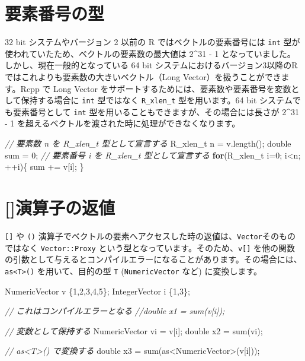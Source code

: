 \documentclass[]{book}
\newenvironment{Shaded}{\begin{snugshade}}{\end{snugshade}}
\newcommand{\CommentTok}[1]{\textcolor[rgb]{0.56,0.35,0.01}{\textit{#1}}}
\newcommand{\ControlFlowTok}[1]{\textcolor[rgb]{0.13,0.29,0.53}{\textbf{#1}}}
\newcommand{\DataTypeTok}[1]{\textcolor[rgb]{0.13,0.29,0.53}{#1}}
\newcommand{\DecValTok}[1]{\textcolor[rgb]{0.00,0.00,0.81}{#1}}
\newcommand{\NormalTok}[1]{#1}
\begin{document}
\section{要素番号の型}

32 bit システムやバージョン 2 以前の R ではベクトルの要素番号には \texttt{int} 型が使われていたため、ベクトルの要素数の最大値は 2\^{}31 - 1 となっていました。しかし、現在一般的となっている 64 bit システムにおけるバージョン3以降のRではこれよりも要素数の大きいベクトル（Long Vector）を扱うことができます。Rcpp で Long Vector をサポートするためには、要素数や要素番号を変数として保持する場合に \texttt{int} 型ではなく \texttt{R\_xlen\_t} 型を用います。64 bit システムでも要素番号として \texttt{int} 型を用いることもできますが、その場合には長さが 2\^{}31 - 1 を超えるベクトルを渡された時に処理ができなくなります。

\begin{Shaded}
\begin{Highlighting}[]
\CommentTok{// 要素数 n を R_xlen_t 型として宣言する}
\DataTypeTok{R_xlen_t}\NormalTok{ n = v.length();}
\DataTypeTok{double}\NormalTok{ sum = }\DecValTok{0}\NormalTok{;}
\CommentTok{// 要素番号 i を R_xlen_t 型として宣言する}
\ControlFlowTok{for}\NormalTok{(}\DataTypeTok{R_xlen_t}\NormalTok{ i=}\DecValTok{0}\NormalTok{; i<n; ++i)\{}
\NormalTok{  sum += v[i];}
\NormalTok{\}}
\end{Highlighting}
\end{Shaded}

\section{{[}{]}演算子の返値}

\texttt{{[}{]}} や \texttt{()} 演算子でベクトルの要素へアクセスした時の返値は、\texttt{Vector}そのものではなく \texttt{Vector::Proxy} という型となっています。そのため、\texttt{v{[}{]}} を他の関数の引数として与えるとコンパイルエラーになることがあります。その場合には、\texttt{as\textless{}T\textgreater{}()} を用いて、目的の型 \texttt{T} (\texttt{NumericVector} など) に変換します。

\begin{Shaded}
\begin{Highlighting}[]
\NormalTok{NumericVector v \{}\DecValTok{1}\NormalTok{,}\DecValTok{2}\NormalTok{,}\DecValTok{3}\NormalTok{,}\DecValTok{4}\NormalTok{,}\DecValTok{5}\NormalTok{\};}
\NormalTok{IntegerVector i \{}\DecValTok{1}\NormalTok{,}\DecValTok{3}\NormalTok{\};}

\CommentTok{// これはコンパイルエラーとなる}
\CommentTok{//double x1 = sum(v[i]);}

\CommentTok{// 変数として保持する}
\NormalTok{NumericVector vi = v[i];}
\DataTypeTok{double}\NormalTok{   x2 = sum(vi);}

\CommentTok{// as<T>() で変換する}
\DataTypeTok{double}\NormalTok{   x3 = sum(as<NumericVector>(v[i]));}
\end{Highlighting}
\end{Shaded}
\end{document}
